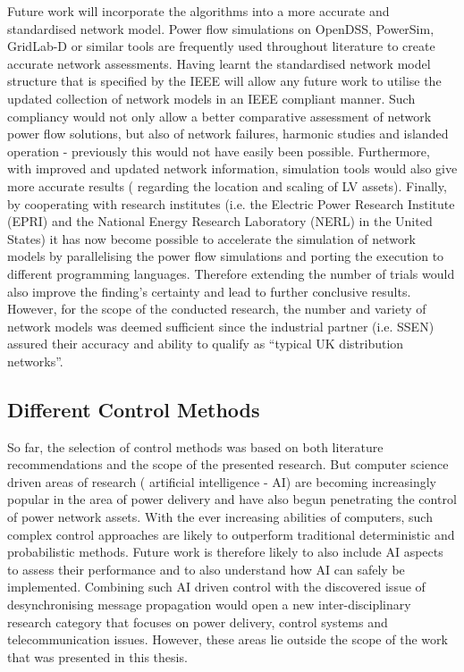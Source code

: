 Future work will incorporate the algorithms into a more accurate and standardised network model.
Power flow simulations on OpenDSS, PowerSim, GridLab-D or similar tools are frequently used throughout literature to create accurate network assessments.
Having learnt the standardised network model structure that is specified by the IEEE will allow any future work to utilise the updated collection of network models in an IEEE compliant manner.
Such compliancy would not only allow a better comparative assessment of network power flow solutions, but also of network failures, harmonic studies and islanded operation - previously this would not have easily been possible.
Furthermore, with improved and updated network information, simulation tools would also give more accurate results ( regarding the location and scaling of LV assets).
Finally, by cooperating with research institutes (i.e. the Electric Power Research Institute (EPRI) and the National Energy Research Laboratory (NERL) in the United States) it has now become possible to accelerate the simulation of network models by parallelising the power flow simulations and porting the execution to different programming languages.
Therefore extending the number of trials would also improve the finding's certainty and lead to further conclusive results.
However, for the scope of the conducted research, the number and variety of network models was deemed sufficient since the industrial partner (i.e. SSEN) assured their accuracy and ability to qualify as ``typical UK distribution networks''.

\subsection{Different Control Methods}

So far, the selection of control methods was based on both literature recommendations and the scope of the presented research.
But computer science driven areas of research ( artificial intelligence - AI) are becoming increasingly popular in the area of power delivery and have also begun penetrating the control of power network assets.
With the ever increasing abilities of computers, such complex control approaches are likely to outperform traditional deterministic and probabilistic methods.
Future work is therefore likely to also include AI aspects to assess their performance and to also understand how AI can safely be implemented.
Combining such AI driven control with the discovered issue of desynchronising message propagation would open a new inter-disciplinary research category that focuses on power delivery, control systems and telecommunication issues.
However, these areas lie outside the scope of the work that was presented in this thesis.

